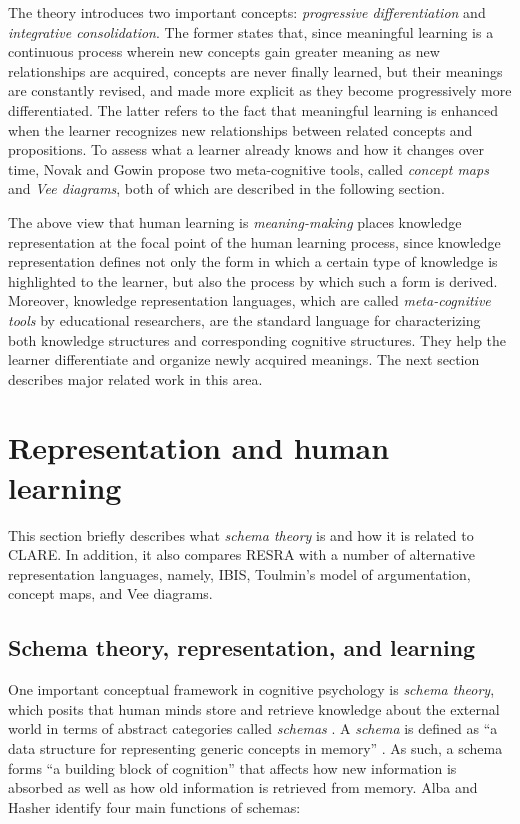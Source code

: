 The theory introduces two important concepts: {\it progressive
differentiation\/} and {\it integrative consolidation\/}. The former states
that, since meaningful learning is a continuous process wherein new
concepts gain greater meaning as new relationships are acquired, concepts
are never finally learned, but their meanings are constantly revised, and
made more explicit as they become progressively more differentiated.  The
latter refers to the fact that meaningful learning is enhanced when the
learner recognizes new relationships between related concepts and 
propositions. To assess what a learner already knows and how it changes
over time, Novak and Gowin \cite{Novak84} propose two meta-cognitive tools,
called {\it concept maps\/} and {\it Vee diagrams\/}, both of which are
described in the following section.

The above view that human learning is {\it meaning-making} places knowledge
representation at the focal point of the human learning process, since
knowledge representation defines not only the form in which a certain type
of knowledge is highlighted to the learner, but also the process by which
such a form is derived. Moreover, knowledge representation languages, which
are called {\it meta-cognitive tools\/} by educational researchers, are the
standard language for characterizing both knowledge structures and
corresponding cognitive structures. They help the learner differentiate and
organize newly acquired meanings. The next section describes major related
work in this area.


\section{Representation and human learning}
\label{sec:representation}

This section briefly describes what {\it schema theory\/} is and how it is
related to CLARE. In addition, it also compares RESRA with a number of
alternative representation languages, namely, IBIS, Toulmin's model of
argumentation, concept maps, and Vee diagrams.


\subsection{Schema theory, representation, and learning}

One important conceptual framework in cognitive psychology is {\it schema
theory\/}, which posits that human minds store and retrieve knowledge about
the external world in terms of abstract categories called {\it schemas\/}
\cite{Stillings87}. A {\it schema\/} is defined as ``a data structure for
representing generic concepts in memory'' \cite{Rumelhart80}.  As such, a
schema forms ``a building block of cognition'' that affects how new
information is absorbed as well as how old information is retrieved
from memory. Alba and Hasher \cite{Alba83} identify four main functions of
schemas:

